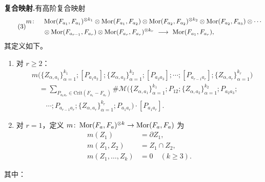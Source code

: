 \textbf{复合映射.}\quad 有高阶复合映射
\begin{equation}\tag{3}\label{eq:3}
\begin{aligned}
m\colon\quad
&\operatorname{Mor}(F_{a_1},F_{a_1})^{\otimes k_1}\otimes\operatorname{Mor}(F_{a_1},F_{a_2})\otimes\operatorname{Mor}(F_{a_2},F_{a_2})^{\otimes k_2}\otimes\operatorname{Mor}(F_{a_2},F_{a_3})\otimes\cdots\\
&\otimes\operatorname{Mor}(F_{a_{r-1}},F_{a_r})\otimes\operatorname{Mor}(F_{a_r},F_{a_r})^{\otimes k_r}
\ \longrightarrow\ \operatorname{Mor}(F_{a_1},F_{a_r}),
\end{aligned}
\end{equation}
其定义如下。

\begin{enumerate}
  \item[(i)] 对 $r\ge 2$：
  \begin{equation}\tag{4}\label{eq:4}
  \begin{aligned}
  &m\bigl(\{Z_{\alpha,a_1}\}_{\alpha=1}^{k_1};[P_{a_1a_2}];\{Z_{\alpha,a_2}\}_{\alpha=1}^{k_2};[P_{a_2a_3}];\cdots;[P_{a_{r-1}a_r}];\{Z_{\alpha,a_r}\}_{\alpha=1}^{k_r}\bigr)\\
  &\quad=\sum_{P_{a_1a_r}\in\mathrm{Crit}(F_{a_1}-F_{a_r})}
  \#\mathcal M\bigl(\{Z_{\alpha,a_1}\}_{\alpha=1}^{k_1};P_{12};\{Z_{\alpha,a_2}\}_{\alpha=1}^{k_2};P_{a_2a_3};\\
  &\qquad\cdots;P_{a_{r-1}a_r};\{Z_{\alpha,a_r}\}_{\alpha=1}^{k_r};P_{a_1a_r}\bigr)\cdot[P_{a_1a_r}].
  \end{aligned}
  \end{equation}
  \item[(ii)] 对 $r=1$，定义 $m\colon\operatorname{Mor}(F_a,F_a)^{\otimes k}\to\operatorname{Mor}(F_a,F_a)$ 为
  \begin{equation}\tag{5}\label{eq:5}
  \begin{aligned}
  m(Z_1)&=\partial Z_1,\\
  m(Z_1,Z_2)&=Z_1\cap Z_2,\\
  m(Z_1,\dots,Z_k)&=0\quad(k\ge 3).
  \end{aligned}
  \end{equation}
\end{enumerate}

其中：

